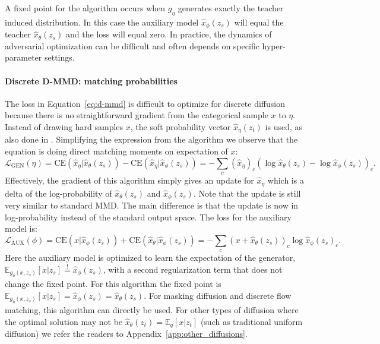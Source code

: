A fixed point for the algorithm occurs when $g_\eta$ generates exactly the teacher induced distribution. In this case the auxiliary model $\hat{x}_\phi(z_s)$ will equal the teacher $\hat{x}_{\theta}(z_s)$ and the loss will equal zero.
In practice, the dynamics of adversarial optimization can be difficult and often depends on specific hyper-parameter settings.


\paragraph{Discrete D-MMD: matching probabilities}
The loss in Equation~\ref{eq:d-mmd} is difficult to optimize for discrete diffusion because there is no straightforward gradient from the categorical sample $x$ to $\eta$. Instead of drawing hard samples $x$, the soft probability vector $\hat{x}_\eta(z_t)$ is used, as also done in \cite{zhu2025dimo}. Simplifying the expression from the algorithm we observe that the equation is doing direct matching moments on expectation of $x$:
\begin{equation}
     \mathcal{L}_{\text{GEN}}(\eta) = \mathrm{CE}\left(\hat{x}_\eta| \hat{x}_\theta(z_s)\right) - \mathrm{CE}\left(\hat{x}_\eta| \hat{x}_\phi(z_s)\right) = -\sum_c (\hat{x}_\eta)_c \left( \log \hat{x}_\theta(z_s) - \log \hat{x}_\phi(z_s)\right)_c.
\end{equation}
Effectively, the gradient of this algorithm simply gives an update for $\hat{x}_\eta$ which is a delta of the log-probability of $\hat{x}_\theta(z_s)$ and $\hat{x}_\phi(z_s)$. Note that the update is still very similar to standard MMD. The main difference is that the update is now in log-probability instead of the standard output space. The loss for the auxiliary model is:
\begin{equation}
     \mathcal{L}_{\text{AUX}}(\phi) = \mathrm{CE}\left(x| \hat{x}_\phi(z_s)\right) + \mathrm{CE}\left(\hat{x}_\theta| \hat{x}_\phi(z_s)\right) = -\sum_c (x + \hat{x}_\theta(z_s))
     _c \log \hat{x}_\phi(z_s)_c.
\end{equation}
Here the auxiliary model is optimized to learn the expectation of the generator, $\mathbb{E}_{g_\eta(x, z_s)}[x|z_s] \stackrel{!}{=} \hat{x}_\phi(z_s)$, with a second regularization term that does not change the fixed point. For this algorithm the fixed point is $\mathbb{E}_{g_\eta(x, z_s)}[x|z_s] = \hat{x}_\phi(z_s) = \hat{x}_\theta(z_s)$. For masking diffusion and discrete flow matching, this algorithm can directly be used. For other types of diffusion where the optimal solution may not be $\hat{x}_\theta(z_t) = \mathbb{E}_q[x | z_t]$ (such as traditional uniform diffusion) we refer the readers to Appendix~\ref{app:other_diffusions}.

